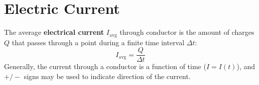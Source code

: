 \section{Electric Current}
%
%      
%
%
%
%
%
%
%
%
%
%
%
%
%
The average \textbf{electrical current} $I_\text{avg}$ through conductor is the
amount of charges $Q$ that passes through a point during a finite time interval
$\Delta t$:
\begin{equation}
  \boxed{
    I_\text{avg}=\frac Q{\Delta t}
  }
\end{equation}
Generally, the current through a conductor is a function of time ($I=I(t)$),
and $+/-$ signs may be used to indicate direction of the current.



